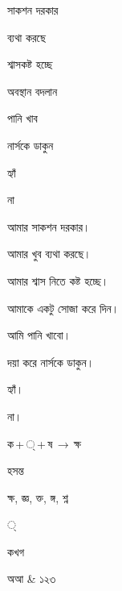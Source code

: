 \documentclass[multi=bnsnip,border={0.4pt 0pt 0.4pt 0pt}]{standalone}
\newenvironment{bnsnip}{\bnfont\fontsize{10}{12}\selectfont\rule[-3.6pt]{0pt}{13.2pt}}{}
\begin{document}
\begin{bnsnip}সাকশন দরকার\end{bnsnip}
\begin{bnsnip}ব্যথা করছে\end{bnsnip}
\begin{bnsnip}শ্বাসকষ্ট হচ্ছে\end{bnsnip}
\begin{bnsnip}অবস্থান বদলান\end{bnsnip}
\begin{bnsnip}পানি খাব\end{bnsnip}
\begin{bnsnip}নার্সকে ডাকুন\end{bnsnip}
\begin{bnsnip}হ্যাঁ\end{bnsnip}
\begin{bnsnip}না\end{bnsnip}
\begin{bnsnip}আমার সাকশন দরকার।\end{bnsnip}
\begin{bnsnip}আমার খুব ব্যথা করছে।\end{bnsnip}
\begin{bnsnip}আমার শ্বাস নিতে কষ্ট হচ্ছে।\end{bnsnip}
\begin{bnsnip}আমাকে একটু সোজা করে দিন।\end{bnsnip}
\begin{bnsnip}আমি পানি খাবো।\end{bnsnip}
\begin{bnsnip}দয়া করে নার্সকে ডাকুন।\end{bnsnip}
\begin{bnsnip}হ্যাঁ।\end{bnsnip}
\begin{bnsnip}না।\end{bnsnip}
\begin{bnsnip}ক\,+\,◌্\,+\,ষ\,$\rightarrow$\,ক্ষ\end{bnsnip}
\begin{bnsnip}হসন্ত\end{bnsnip}
\begin{bnsnip}ক্ষ, জ্ঞ, ক্ত, ঙ্গ, শ্ন\end{bnsnip}
\begin{bnsnip}◌্\end{bnsnip}
\begin{bnsnip}কখগ\end{bnsnip}
\begin{bnsnip}অআ {\rmfamily\&} ১২৩\end{bnsnip}
\end{document}
